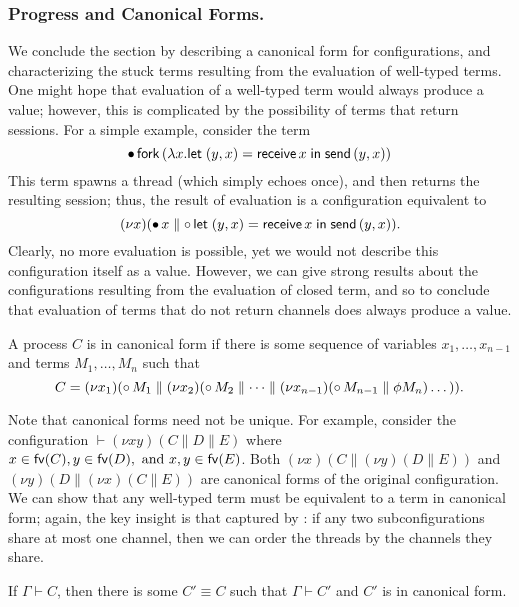 \documentclass[oribibl,orivec,envcountsame]{llncs}
\begin{document}
\subsubsection{Progress and Canonical Forms.}

We conclude the section by describing a canonical form for configurations, and characterizing the
stuck terms resulting from the evaluation of well-typed terms.  One might hope that evaluation of a
well-typed term would always produce a value; however, this is complicated by the possibility of
terms that return sessions.  For a simple example, consider the term
%
\[
  {\mathord{\bullet}}\,\mathsf{fork} \, (\lambda x. \mathsf{let}\;(y,x) = \mathsf{receive} \, x\;\mathsf{in}\;\mathsf{send} \, (y,x))
\]
%
This term spawns a thread (which simply echoes once), and then returns the resulting session; thus,
the result of evaluation is a configuration equivalent to
\[
  (\nu x)({\mathord{\bullet}}\,x \parallel {\mathord{\circ}}\,\mathsf{let}\;(y,x) = \mathsf{receive} \, x\;\mathsf{in}\;\mathsf{send} \, (y,x)).
\]
Clearly, no more evaluation is possible, yet we would not describe this configuration itself as a
value.  However, we can give strong results about the configurations resulting from the evaluation
of closed term, and so to conclude that evaluation of terms that do not return channels does always
produce a value.

\begin{definition}
A process $C$ is in canonical form if there is some sequence of variables $x_1,\dots,x_{n-1}$ and
terms $M_1,\dots,M_n$ such that
\[
  C = (\nu x_1)({\mathord{\circ}}\,M_1 \parallel (\nu x_2)({\mathord{\circ}}\,M_2 \parallel \dots \parallel (\nu x_{n-1})({\mathord{\circ}}\,M_{n-1} \parallel \phi M_n)\dots)).
\]
\end{definition}

Note that canonical forms need not be unique.  For example, consider the configuration $\vdash (\nu
xy)(C \parallel D \parallel E)$ where $x \in \mathsf{fv}(C), y \in \mathsf{fv}(D), \text{ and } x,y \in \mathsf{fv}(E)$.
Both $(\nu x)(C \parallel (\nu y)(D \parallel E))$ and $(\nu y)(D \parallel (\nu x)(C \parallel E))$
are canonical forms of the original configuration.  We can show that any well-typed term must be
equivalent to a term in canonical form; again, the key insight is that captured by
: if any two subconfigurations share at most one channel, then we
can order the threads by the channels they share.

\begin{lemma}\label{lem:canonical}
  If $\Gamma \vdash C$, then there is some $C' \equiv C$ such that $\Gamma \vdash C'$ and $C'$ is in
  canonical form.
\end{lemma}
\end{document}
